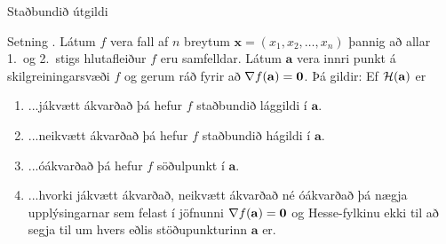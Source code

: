 \begin{frame}{Staðbundið útgildi} 

\begin {block}{Setning \kaflanr.}
 Látum $f$ vera fall af $n$ breytum $\mathbf{x} = (x_1,x_2,\ldots,x_n)$ þannig að allar
1.~og 2.~stigs hlutafleiður $f$ eru samfelldar.  Látum $\mathbf{a}$ vera
innri punkt á skilgreiningarsvæði $f$ og gerum ráð fyrir að $\nabla
f(\mathbf{a})=\mbox{${\bf 0}$}$.  Þá gildir: Ef ${\cal H}(\mathbf{a})$ er 
\begin {enumerate}
 \item  ...jákvætt ákvarðað þá hefur $f$ staðbundið
     lággildi í $\mathbf{a}$.
\item ...neikvætt ákvarðað þá hefur $f$ staðbundið
     hágildi í $\mathbf{a}$.
\item    ...óákvarðað þá hefur $f$ söðulpunkt í
      $\mathbf{a}$.  
\item ...hvorki jákvætt ákvarðað, neikvætt ákvarðað
      né óákvarðað þá nægja upplýsingarnar sem felast í jöfnunni
      $\nabla f(\mathbf{a})=\mbox{${\bf 0}$}$ og Hesse-fylkinu ekki til að segja til um
      hvers eðlis stöðupunkturinn $\mathbf{a}$ er.
\end {enumerate}

\end{block}

\end{frame}


